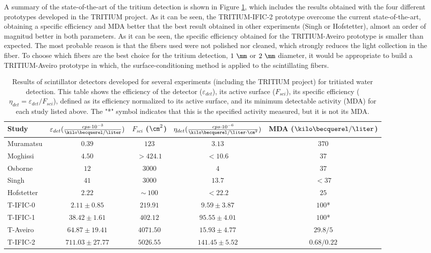 \begin{enumerate}
\begin{itemize}
A summary of the state-of-the-art of the tritium detection is shown in Figure \ref{tab:ComparisonResultsTritium}, which includes the results obtained with the four different prototypes developed in the TRITIUM project. As it can be seen, the TRITIUM-IFIC-2 prototype overcome the current state-of-the-art, obtaining a specific efficiency and MDA better that the best result obtained in other experiments (Singh or Hofstetter), almost an order of magnitud better in both parameters. As it can be seen, the specific efficiency obtained for the TRITIUM-Aveiro prototype is smaller than expected. The most probable reason is that the fibers used were not polished nor cleaned, which strongly reduces the light collection in the fiber. To choose which fibers are the best choice for the tritium detection, $1~\mm$ or $2~\mm$ diameter, it would be appropriate to build a TRITIUM-Aveiro prototype in which, the surface-conditioning method is applied to the scintillating fibers.

\begin{table}[htbp]
\centering{}%
\begin{tabular}{lcccc}
\toprule 
Study & \parbox{5.5em}{$\varepsilon_{det}(\frac{cps \cdot{} 10^{-3}}{\kilo\becquerel/\liter})$}  & \parbox{4.5em}{$F_{sci}$ ($\cm^2$)}  & \parbox{6.5em}{$\eta_{det}(\frac{cps \cdot{} 10^{-6}}{\kilo\becquerel/ \liter \cdot{} \cm^2})$} & MDA ($\kilo\becquerel / \liter$) \tabularnewline
\midrule
\midrule 
Muramatsu & $0.39$ & $123$ & $3.13$ & $370$ \tabularnewline
Moghissi & $4.50$ & $>424.1$ & $<10.6$ & $37$ \tabularnewline
Osborne & $12$ & $3000$ & $4$ & $37$ \tabularnewline
Singh & $41$ & $3000$ & $13.7$ & $<37$ \tabularnewline
Hofstetter & $2.22$ & $\sim~100$ & $<22.2$ & $25$ \tabularnewline
T-IFIC-0 & $2.11 \pm 0.85$ & $219.91$ & $9.59 \pm 3.87$ & $100$* \tabularnewline
T-IFIC-1 & $38.42 \pm 1.61$ & $402.12$ & $95.55 \pm 4.01$ & $100$* \tabularnewline
T-Aveiro & $64.87 \pm 19.41$ & $4071.50$ & $15.93 \pm 4.77$ & $29.8/5$ \tabularnewline
T-IFIC-2 & $711.03 \pm 27.77$ & $5026.55$ & $141.45 \pm 5.52$ & $0.68/0.22$ \tabularnewline
\bottomrule
\end{tabular}
\caption{Results of scintillator detectors developed for several experiments (including the TRITIUM project) for tritiated water detection. This table shows the efficiency of the detector ($\varepsilon_{det}$), its active surface ($F_{sci}$), its specific efficiency ($\eta_{det}=\varepsilon_{det}/F_{sci}$), defined as its efficiency normalized to its active surface, and its minimum detectable activity (MDA) for each study listed above. The "*" symbol indicates that this is the specified activity measured, but it is not its MDA.}
\label{tab:ComparisonResultsTritium}
\end{table}


\end{itemize}
\end{enumerate}

